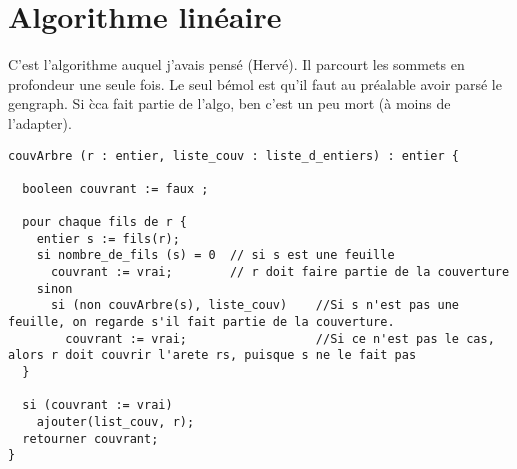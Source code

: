 \section{Algorithme lin\'eaire}

C'est l'algorithme auquel j'avais pens\'e (Herv\'e).
Il parcourt les sommets en profondeur une seule fois. Le seul b\'emol est qu'il faut au pr\'ealable avoir pars\'e le gengraph.
Si \`c{c}a fait partie de l'algo, ben c'est un peu mort (\`a moins de l'adapter).


\begin{verbatim}
couvArbre (r : entier, liste_couv : liste_d_entiers) : entier {

  booleen couvrant := faux ;
  
  pour chaque fils de r {
    entier s := fils(r);
    si nombre_de_fils (s) = 0  // si s est une feuille
      couvrant := vrai;        // r doit faire partie de la couverture
    sinon
      si (non couvArbre(s), liste_couv)    //Si s n'est pas une feuille, on regarde s'il fait partie de la couverture.
        couvrant := vrai;                  //Si ce n'est pas le cas, alors r doit couvrir l'arete rs, puisque s ne le fait pas
  }
  
  si (couvrant := vrai)
    ajouter(list_couv, r);
  retourner couvrant;  
}
\end{verbatim}

